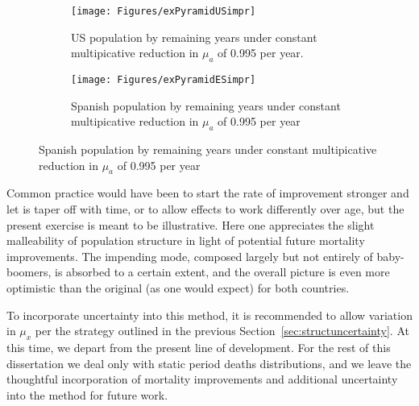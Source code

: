 \begin{figure}
        \centering
        \begin{subfigure}
                \centering
                \caption{US population by remaining years under
                constant multipicative reduction in $\mu_a$ of 0.995 per year.}
                \texttt{[image: Figures/exPyramidUSimpr]}
                \label{fig:exPyrUSimpr}
        \end{subfigure}
        \begin{subfigure}
                \centering
                \caption{Spanish population by remaining years under
                constant multipicative reduction in $\mu_a$ of 0.995 per year}
                \texttt{[image: Figures/exPyramidESimpr]}
                \label{fig:exPyrESimpr}
        \end{subfigure}
\end{figure}

Common practice would have been to start the rate of improvement stronger
and let is taper off with time, or to allow effects to work differently over
age, but the present exercise is meant to be illustrative. Here one appreciates
the slight malleability of population structure in light of potential future
mortality improvements. The impending mode, composed largely but not entirely of
baby-boomers, is absorbed to a certain extent, and the overall picture is even
more optimistic than the original (as one would expect) for both countries.

To incorporate uncertainty into this method, it is
recommended to allow variation in $\mu_x$ per the strategy outlined in the
previous Section~\ref{sec:structuncertainty}. At this time, we depart from the
present line of development. For the rest of this dissertation we deal only with static
period deaths distributions, and we leave the thoughtful incorporation of mortality 
improvements and additional uncertainty into the method for future work.

\FloatBarrier